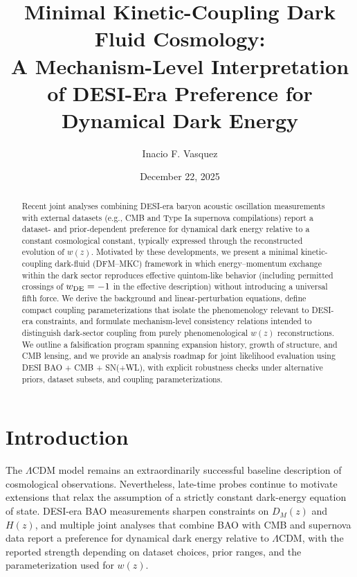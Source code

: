 \documentclass[reprint,aps,prd,nofootinbib,superscriptaddress]{revtex4-2}
\newcommand{\LCDM}{\ensuremath{\Lambda\mathrm{CDM}}\xspace}
\newcommand{\wde}{\ensuremath{w_{\rm DE}}\xspace}
\newcommand{\wz}{\ensuremath{w(z)}\xspace}
\begin{document}
\title{Minimal Kinetic-Coupling Dark Fluid Cosmology:\\
A Mechanism-Level Interpretation of DESI-Era Preference for Dynamical Dark Energy}

\author{Inacio F. Vasquez}

\date{December 22, 2025}

\begin{abstract}
Recent joint analyses combining DESI-era baryon acoustic oscillation measurements with external datasets
(e.g., CMB and Type Ia supernova compilations) report a dataset- and prior-dependent preference for
dynamical dark energy relative to a constant cosmological constant, typically expressed through the reconstructed evolution of \wz.
Motivated by these developments, we present a minimal kinetic-coupling dark-fluid (DFM--MKC) framework in which
energy--momentum exchange within the dark sector reproduces effective quintom-like behavior (including permitted crossings of $\wde=-1$ in the effective description)
without introducing a universal fifth force.
We derive the background and linear-perturbation equations, define compact coupling parameterizations that isolate the phenomenology relevant to DESI-era constraints,
and formulate mechanism-level consistency relations intended to distinguish dark-sector coupling from purely phenomenological \wz reconstructions.
We outline a falsification program spanning expansion history, growth of structure, and CMB lensing, and we provide an analysis roadmap for joint likelihood evaluation using DESI BAO + CMB + SN(+WL),
with explicit robustness checks under alternative priors, dataset subsets, and coupling parameterizations.
\end{abstract}

\maketitle

\section{Introduction}
\label{sec:intro}

The \LCDM model remains an extraordinarily successful baseline description of cosmological observations.
Nevertheless, late-time probes continue to motivate extensions that relax the assumption of a strictly constant dark-energy equation of state.
DESI-era BAO measurements sharpen constraints on $D_M(z)$ and $H(z)$, and multiple joint analyses that combine BAO with CMB and supernova data report a preference for dynamical dark energy relative to \LCDM,
with the reported strength depending on dataset choices, prior ranges, and the parameterization used for \wz.
\end{document}
